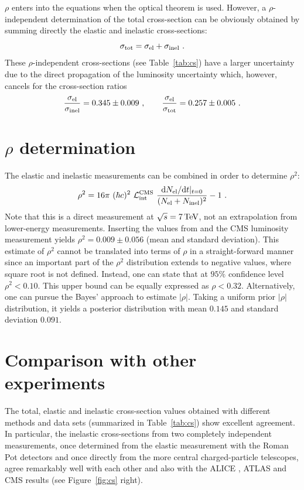 \documentclass[TOTEM]{cern/cernphprep}
\def\d{{\rm d}}
\def\un#1{\,{\rm #1}}
\begin{document}
$\rho$ enters into the equations when the optical theorem is used. However, a $\rho$-independent determination of the total cross-section can be obviously obtained by summing directly the elastic \cite{P1} and inelastic  \cite{P2} cross-sections:
\begin{equation}
\label{eq:m rho indep}
\sigma_{\rm tot} = \sigma_{\rm el} + \sigma_{\rm inel}\ .
\end{equation}
These $\rho$-independent cross-sections (see Table~\ref{tab:cs}) have a larger uncertainty due to the direct propagation of the luminosity uncertainty which, however, cancels for the cross-section ratios
$$
{\sigma_{\rm el} \over \sigma_{\rm inel}} = 0.345 \pm 0.009\ ,\qquad {\sigma_{\rm el}\over \sigma_{\rm tot}} = 0.257 \pm 0.005\ .
$$


\section{$\rho$ determination}

The elastic and inelastic measurements can be combined in order to determine $\rho^2$:
\begin{equation}
\label{eq:rho}
\rho^2 = 16\pi\ (\hbar c)^2\ {\cal L_{\rm int}^{\rm CMS}}\ {\d N_{\rm el}/\d t|_{t=0}\over (N_{\rm el} + N_{\rm inel})^2} - 1\ .
\end{equation}
Note that this is a direct measurement at $\sqrt s = 7\un{TeV}$, not an extrapolation from lower-energy measurements. Inserting the values from \cite{P1,P2} and the CMS luminosity measurement yields $\rho^2 = 0.009 \pm 0.056$ (mean and standard deviation). This estimate of $\rho^2$ cannot be translated into terms of $\rho$ in a straight-forward manner since an important part of the $\rho^2$ distribution extends to negative values, where square root is not defined. Instead, one can state that at $95\%$ confidence level $\rho^2 < 0.10$. This upper bound can be equally expressed as $\rho < 0.32$. Alternatively, one can pursue the Bayes' approach to estimate $|\rho|$. Taking a uniform prior $|\rho|$ distribution, it yields a posterior distribution with mean $0.145$ and standard deviation $0.091$.

\section{Comparison with other experiments}

The total, elastic and inelastic cross-section values obtained with different methods and data sets (summarized in Table~\ref{tab:cs}) show excellent agreement. In particular, the inelastic cross-sections from two completely independent measurements, once determined from the elastic measurement with the Roman Pot detectors and once directly from the more central charged-particle telescopes, agree remarkably well with each other and also with the ALICE \cite{alice_inel}, ATLAS \cite{atlas_inel} and CMS \cite{cms_inel} results (see Figure~\ref{fig:cs} right).
\end{document}
